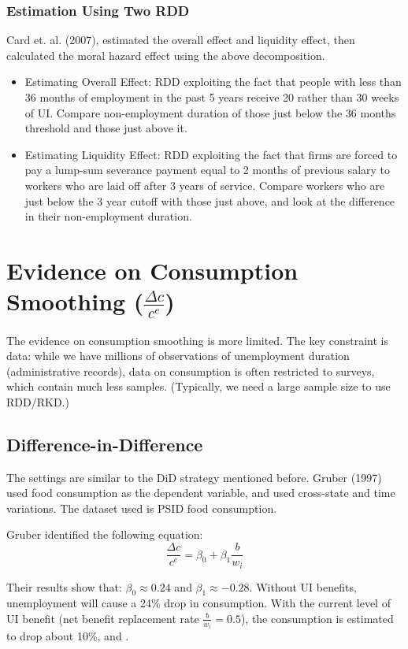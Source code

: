             \subsubsection{Estimation Using Two RDD}
                Card et. al. (2007), estimated the overall effect and liquidity effect, then calculated the moral hazard effect using the above decomposition.
                \begin{itemize}
                    \item Estimating Overall Effect: RDD exploiting the fact that people with less than 36 months of employment in the past 5 years receive 20 rather than 30 weeks of UI. Compare non-employment duration of those just below the 36 months threshold and those just above it.
                    \item Estimating Liquidity Effect: RDD exploiting the fact that firms are forced to pay a lump-sum severance payment equal to 2 months of previous salary to workers who are laid off after 3 years of service. Compare workers who are just below the 3 year cutoff with those just above, and look at the difference in their non-employment duration.
                \end{itemize}
        
\section{Evidence on Consumption Smoothing ($\frac{\Delta c}{c^e}$)}
    The evidence on consumption smoothing is more limited. The key constraint is data: while we have millions of observations of unemployment duration (administrative records), data on consumption is often restricted to surveys, which contain much less samples. (Typically, we need a large sample size to use RDD/RKD.)
    
    \subsection{Difference-in-Difference}
        The settings are similar to the DiD strategy mentioned before. Gruber (1997) used food consumption as the dependent variable, and used cross-state and time variations. The dataset used is PSID food consumption.
        
        Gruber identified the following equation:
        $$\frac{\Delta c}{c^e} = \beta_0 + \beta_1 \frac{b}{w_i}$$
        
        Their results show that: $\beta_0 \approx 0.24$ and $\beta_1 \approx -0.28$. Without UI benefits, unemployment will cause a 24\% drop in consumption. With the current level of UI benefit (net benefit replacement rate $\frac{b}{w_i}=0.5$), the consumption is estimated to drop about 10\%, and .
        
